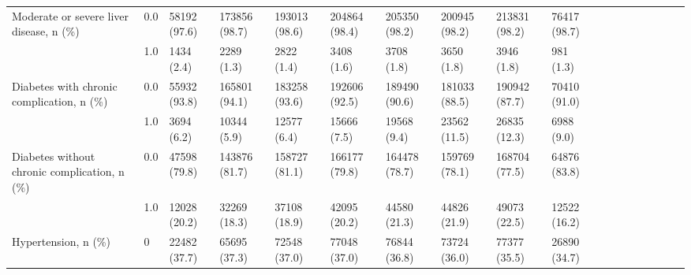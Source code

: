 \begin{tabular}{llllllllllllllllll}
Moderate or severe liver disease, n (\%) & 0.0 &                 58192 (97.6) &   173856 (98.7) &   193013 (98.6) &   204864 (98.4) &   205350 (98.2) &   200945 (98.2) &   213831 (98.2) &   76417 (98.7) &                   &                    &                    &                    &                    &                     &                     &                     \\
                                       & 1.0 &                   1434 (2.4) &      2289 (1.3) &      2822 (1.4) &      3408 (1.6) &      3708 (1.8) &      3650 (1.8) &      3946 (1.8) &      981 (1.3) &                   &                    &                    &                    &                    &                     &                     &                     \\
Diabetes with chronic complication, n (\%) & 0.0 &                 55932 (93.8) &   165801 (94.1) &   183258 (93.6) &   192606 (92.5) &   189490 (90.6) &   181033 (88.5) &   190942 (87.7) &   70410 (91.0) &                   &                    &                    &                    &                    &                     &                     &                     \\
                                       & 1.0 &                   3694 (6.2) &     10344 (5.9) &     12577 (6.4) &     15666 (7.5) &     19568 (9.4) &    23562 (11.5) &    26835 (12.3) &     6988 (9.0) &                   &                    &                    &                    &                    &                     &                     &                     \\
Diabetes without chronic complication, n (\%) & 0.0 &                 47598 (79.8) &   143876 (81.7) &   158727 (81.1) &   166177 (79.8) &   164478 (78.7) &   159769 (78.1) &   168704 (77.5) &   64876 (83.8) &                   &                    &                    &                    &                    &                     &                     &                     \\
                                       & 1.0 &                 12028 (20.2) &    32269 (18.3) &    37108 (18.9) &    42095 (20.2) &    44580 (21.3) &    44826 (21.9) &    49073 (22.5) &   12522 (16.2) &                   &                    &                    &                    &                    &                     &                     &                     \\
Hypertension, n (\%) & 0 &                 22482 (37.7) &    65695 (37.3) &    72548 (37.0) &    77048 (37.0) &    76844 (36.8) &    73724 (36.0) &    77377 (35.5) &   26890 (34.7) &                   &                    &                    &                    &                    &                     &                     &                     \\

\end{tabular}
